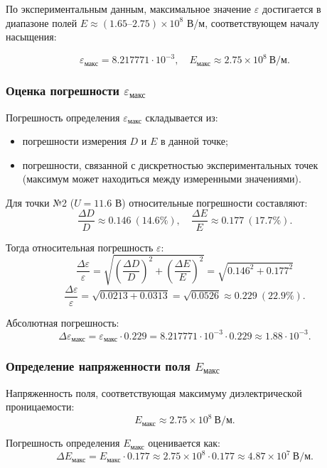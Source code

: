 \documentclass[a4paper,14pt]{article}
\begin{document}
По экспериментальным данным, максимальное значение \(\varepsilon\) достигается в диапазоне полей \(E \approx (1.65\text{--}2.75)\times 10^8\) В/м, соответствующем началу насыщения:

\[
\varepsilon_{\text{макс}} = 8.217771 \cdot 10^{-3}, \quad E_{\text{макс}} \approx 2.75 \times 10^8 \ \text{В/м}.
\]

\subsubsection*{Оценка погрешности \(\varepsilon_{\text{макс}}\)}

Погрешность определения \(\varepsilon_{\text{макс}}\) складывается из:
\begin{itemize}
    \item погрешности измерения \(D\) и \(E\) в данной точке;
    \item погрешности, связанной с дискретностью экспериментальных точек (максимум может находиться между измеренными значениями).
\end{itemize}

Для точки №2 (\(U = 11.6\) В) относительные погрешности составляют:
\[
\frac{\Delta D}{D} \approx 0.146 \ (14.6\%), \quad \frac{\Delta E}{E} \approx 0.177 \ (17.7\%).
\]

Тогда относительная погрешность \(\varepsilon\):
\[
\frac{\Delta \varepsilon}{\varepsilon} = \sqrt{ \left( \frac{\Delta D}{D} \right)^2 + \left( \frac{\Delta E}{E} \right)^2 } = \sqrt{0.146^2 + 0.177^2}
\]
\[
\frac{\Delta \varepsilon}{\varepsilon} = \sqrt{0.0213 + 0.0313} = \sqrt{0.0526} \approx 0.229 \ (22.9\%).
\]

Абсолютная погрешность:
\[
\Delta \varepsilon_{\text{макс}} = \varepsilon_{\text{макс}} \cdot 0.229 = 8.217771 \cdot 10^{-3} \cdot 0.229 \approx 1.88 \cdot 10^{-3}.
\]

\subsubsection*{Определение напряженности поля \(E_{\text{макс}}\)}

Напряженность поля, соответствующая максимуму диэлектрической проницаемости:
\[
E_{\text{макс}} \approx 2.75 \times 10^8 \ \text{В/м}.
\]

Погрешность определения \(E_{\text{макс}}\) оценивается как:
\[
\Delta E_{\text{макс}} = E_{\text{макс}} \cdot 0.177 \approx 2.75\times10^8 \cdot 0.177 \approx 4.87\times10^7 \ \text{В/м}.
\]
\end{document}
